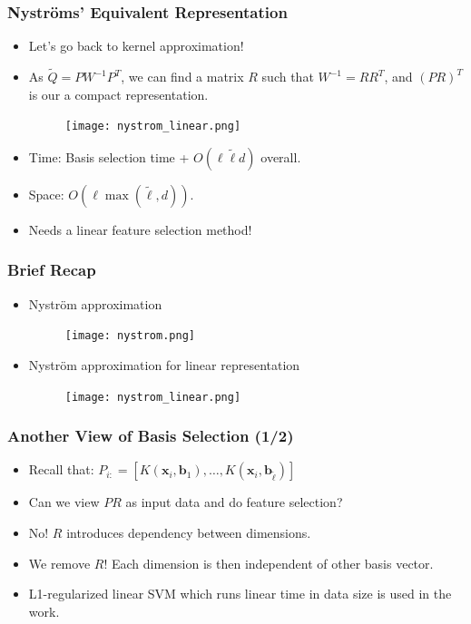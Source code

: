 \documentclass{beamer}
\def\bb{{\boldsymbol b}}
\def\bb{{\boldsymbol b}}
\def\bx{{\boldsymbol x}}
\begin{document}
\begin{frame}
  \frametitle{Nystr\"oms' Equivalent Representation}
  \begin{itemize}
    \item Let's go back to kernel approximation!
    \pause
    \item As $\tilde{Q} = PW^{-1}P^T$, we can find a matrix $R$ such that $W^{-1} = RR^T$, and $(PR)^T$ is our a compact representation.
    \pause
\begin{figure}
  \texttt{[image: nystrom\_linear.png]}\\
\end{figure}
    \pause
    \item [] Time: Basis selection time + $O(\ell \tilde{\ell} d)$ overall.
    \item [] Space: $O(\ell \max(\tilde{\ell}, d))$.
    \pause
    \item Needs a linear feature selection method!
  \end{itemize}
\end{frame}


\begin{frame}
  \frametitle{Brief Recap}
  \begin{itemize}
  \item Nystr\"om approximation
  \begin{figure}
    \texttt{[image: nystrom.png]}
  \end{figure}
  \item Nystr\"om approximation for linear representation
  \begin{figure}
    \texttt{[image: nystrom\_linear.png]}
  \end{figure}
  \end{itemize}
\end{frame}

\begin{frame}
  \frametitle{Another View of Basis Selection (1/2)}
  \begin{itemize}
    \item Recall that: $P_{i:} = [K(\bx_i, \bb_1), \dots, K(\bx_i, \bb_{\tilde{\ell}})]$
    \item Can we view $PR$ as input data and do feature selection?
    \pause
    \item No! $R$ introduces dependency between dimensions.
    \pause
    \item We remove $R$! Each dimension is then independent of other basis vector.
    \item L1-regularized linear SVM which runs linear time in data size is used in the work.
  \end{itemize}
\end{frame}
\end{document}
